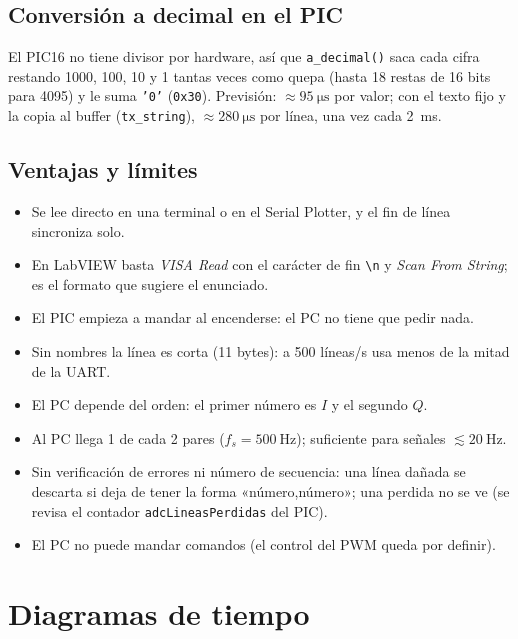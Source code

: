 \documentclass[11pt,letterpaper]{article}
\begin{document}
\subsection{Conversión a decimal en el PIC}

El PIC16 no tiene divisor por hardware, así que \texttt{a\_decimal()} saca cada cifra restando 1000, 100, 10 y 1 tantas veces como quepa (hasta 18 restas de 16 bits para 4095) y le suma \texttt{'0'} (\texttt{0x30}). Previsión: $\approx\SI{95}{\micro\second}$ por valor; con el texto fijo y la copia al buffer (\texttt{tx\_string}), $\approx\SI{280}{\micro\second}$ por línea, una vez cada \SI{2}{\milli\second}.

\subsection{Ventajas y límites}

\begin{itemize}
  \item[+] Se lee directo en una terminal o en el Serial Plotter, y el fin de línea sincroniza solo.
  \item[+] En LabVIEW basta \emph{VISA Read} con el carácter de fin \texttt{\textbackslash n} y \emph{Scan From String}; es el formato que sugiere el enunciado.
  \item[+] El PIC empieza a mandar al encenderse: el PC no tiene que pedir nada.
  \item[+] Sin nombres la línea es corta (11 bytes): a 500 líneas/s usa menos de la mitad de la UART.
  \item[$-$] El PC depende del orden: el primer número es $I$ y el segundo $Q$.
  \item[$-$] Al PC llega 1 de cada 2 pares ($f_s = \SI{500}{\hertz}$); suficiente para señales $\lesssim \SI{20}{\hertz}$.
  \item[$-$] Sin verificación de errores ni número de secuencia: una línea dañada se descarta si deja de tener la forma «número,número»; una perdida no se ve (se revisa el contador \texttt{adcLineasPerdidas} del PIC).
  \item[$-$] El PC no puede mandar comandos (el control del PWM queda por definir).
\end{itemize}

\section{Diagramas de tiempo}
\end{document}
